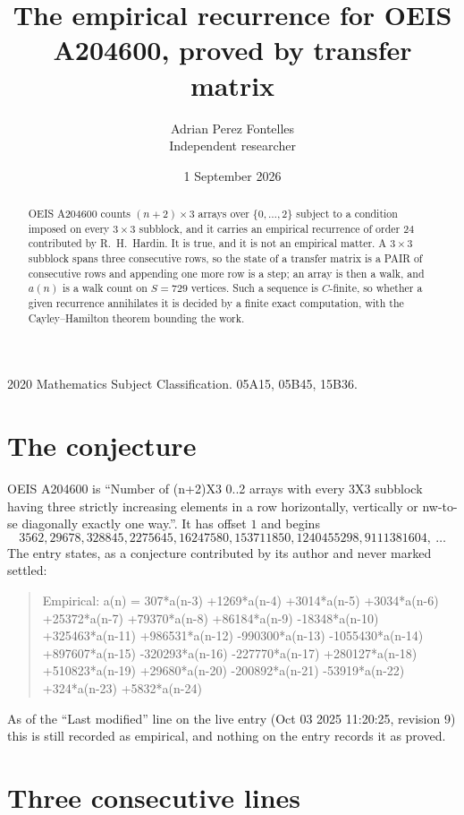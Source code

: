 \documentclass[11pt,a4paper]{article}
\title{The empirical recurrence for OEIS A204600, proved by transfer matrix}
\author{Adrian Perez Fontelles\\ \small Independent researcher}
\date{1 September 2026}
\theoremstyle{plain}
\theoremstyle{definition}
\begin{document}
\maketitle

\begin{abstract}
OEIS A204600 counts $(n+2)\times3$ arrays over $\{0,\dots,2\}$ subject to a condition imposed on
every $3\times3$ subblock, and it carries an empirical recurrence of order $24$
contributed by R.~H.~Hardin. It is true, and it is not an empirical matter. A $3\times3$
subblock spans three consecutive rows, so the state of a transfer matrix is a PAIR of
consecutive rows and appending one more row is a step; an array is then a walk, and
$a(n)$ is a walk count on $S=729$ vertices. Such a sequence is $C$-finite, so whether a given
recurrence annihilates it is decided by a finite exact computation, with the Cayley--Hamilton
theorem bounding the work.
\end{abstract}

\noindent\small 2020 Mathematics Subject Classification. 05A15, 05B45, 15B36.\normalsize

\section{The conjecture}

OEIS A204600 is ``Number of (n+2)X3 0..2 arrays with every 3X3 subblock having three strictly increasing elements in a row horizontally, vertically or nw-to-se diagonally exactly one way.''. It has offset $1$ and begins
\[
3562, 29678, 328845, 2275645, 16247580, 153711850, 1240455298, 9111381604,\ \dots
\]
The entry states, as a conjecture contributed by its author and never marked settled:
\begin{quote}
Empirical: a(n) = 307*a(n-3) +1269*a(n-4) +3014*a(n-5) +3034*a(n-6) +25372*a(n-7) +79370*a(n-8) +86184*a(n-9) -18348*a(n-10) +325463*a(n-11) +986531*a(n-12) -990300*a(n-13) -1055430*a(n-14) +897607*a(n-15) -320293*a(n-16) -227770*a(n-17) +280127*a(n-18) +510823*a(n-19) +29680*a(n-20) -200892*a(n-21) -53919*a(n-22) +324*a(n-23) +5832*a(n-24)
\end{quote}
As of the ``Last modified'' line on the live entry (Oct 03 2025 11:20:25, revision 9) this is still
recorded as empirical, and nothing on the entry records it as proved.

\section{Three consecutive lines}
\end{document}
